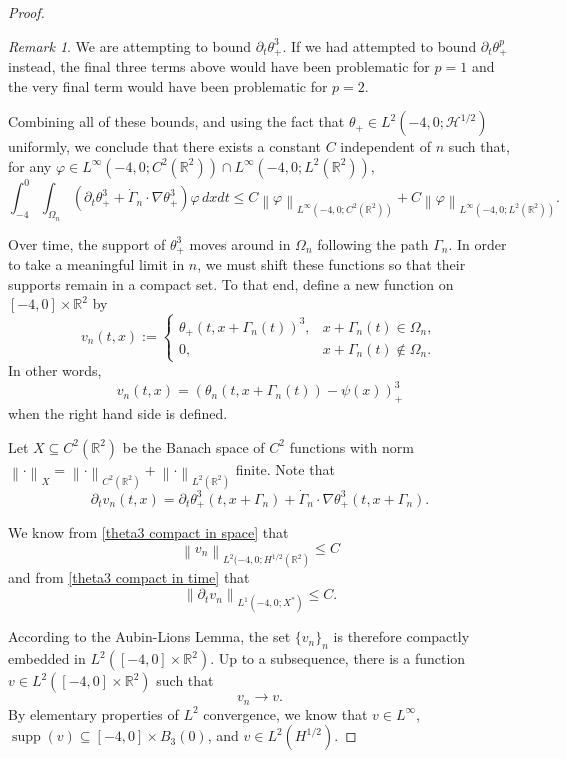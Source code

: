 \documentclass[11pt]{amsart}
\theoremstyle{remark}
\newtheorem*{remark}{Remark}
\theoremstyle{definition}
\newcommand{\R}{\mathbb{R}}
\newcommand{\norm}[1]{\left\lVert#1\right\rVert}
\newcommand{\paren}[1]{\left( #1 \right)}
\DeclareMathOperator{\supp}{supp}
\newcommand{\del}{\partial}
\newcommand{\grad}{\nabla}
\newcommand{\HD}{\mathcal{H}}
\begin{document}
\begin{proof}
\begin{itemize}
\end{itemize}

\begin{remark}
We are attempting to bound $\del_t \theta_+^3$.  If we had attempted to bound $\del_t \theta_+^p$ instead, the final three terms above would have been problematic for $p=1$ and the very final term would have been problematic for $p=2$.  
\end{remark}

Combining all of these bounds, and using the fact that $\theta_+ \in L^2(-4,0; \HD^{1/2})$ uniformly, we conclude that there exists a constant $C$ independent of $n$ such that, for any $\varphi \in L^\infty(-4,0; C^2(\R^2)) \cap L^\infty(-4,0; L^2(\R^2))$, 
\begin{equation} \label{theta3 compact in time} \int_{-4}^0 \int_{\Omega_n} \paren{ \del_t \theta_+^3 + \dot{\Gamma}_n \cdot \grad \theta_+^3 } \varphi \,dxdt \leq C \norm{\varphi}_{L^\infty(-4,0; C^2(\R^2))} + C \norm{\varphi}_{L^\infty(-4,0; L^2(\R^2))}. \end{equation}

Over time, the support of $\theta_+^3$ moves around in $\Omega_n$ following the path $\Gamma_n$.  In order to take a meaningful limit in $n$, we must shift these functions so that their supports remain in a compact set.  To that end, define a new function on $[-4,0] \times \R^2$ by
\[ v_n(t,x) := \begin{cases}
\theta_+(t, x + \Gamma_n(t))^3, & x + \Gamma_n(t) \in \Omega_n, \\
0, & x + \Gamma_n(t) \notin \Omega_n.
\end{cases} \]
In other words,
\begin{equation} \label{definition of v_n} v_n(t,x) = \paren{\theta_n(t, x + \Gamma_n(t)) - \psi(x)}_+^3 \end{equation}
when the right hand side is defined.

Let $X \subseteq C^2(\R^2)$ be the Banach space of $C^2$ functions with norm $\norm{\cdot}_X = \norm{\cdot}_{C^2(\R^2)} + \norm{\cdot}_{L^2(\R^2)}$ finite.  Note that
\[ \del_t v_n(t,x) = \del_t \theta_+^3(t,x+\Gamma_n) + \dot{\Gamma}_n \cdot \grad \theta_+^3(t,x+\Gamma_n). \]

We know from \eqref{theta3 compact in space} that
\[ \norm{ v_n }_{L^2(-4,0; H^{1/2}(\R^2)} \leq C \]
and from \eqref{theta3 compact in time} that
\[ \norm{ \del_t v_n }_{L^1(-4,0; X^*)} \leq C. \]

According to the Aubin-Lions Lemma, the set $\{v_n\}_n$ is therefore compactly embedded in $L^2([-4,0]\times\R^2)$.  Up to a subsequence, there is a function $v \in L^2([-4,0]\times\R^2)$ such that
\[ v_n \to v. \]
By elementary properties of $L^2$ convergence, we know that $v \in L^\infty$, $\supp(v) \subseteq [-4,0]\times B_3(0)$, and $v \in L^2(H^{1/2})$.  


\end{proof}
\end{document}
